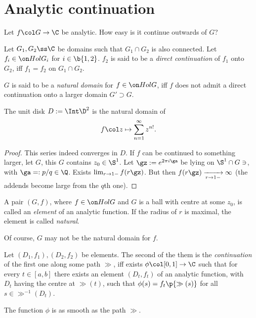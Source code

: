 \section{Analytic continuation}

Let $f \col G \to \C$ be analytic.
How easy is it continue outwards of $G$?

\begin{definition}
  Let $G_1, G_2 \ss \C$ be domains such that $G_1 \cap G_2$ is also connected.
  Let $f_i \in \Hol G_i$ for $i \in \b{1, 2}$.
  $f_2$ is said to be a \emph{direct continuation} of $f_1$ onto $G_2$, iff $f_1 = f_2$ on $G_1 \cap G_2$.
\end{definition}

\begin{definition}
  $G$ is said to be a \emph{natural domain} for $f \in \Hol G$, iff $f$ does not admit a direct continuation onto a larger domain $G' \supset G$.
\end{definition}

\begin{theorem}[Hadamard]
  The unit disk $D := \Int \D^2$ is the natural domain of
  $$ f \col z \mapsto \sum_{n=1}^\infty z^{n!}. $$
\end{theorem}

\begin{proof}
  This series indeed converges in $D$.
  If $f$ can be continued to something larger, let $G$, this $G$ contains $z_0 \in \S^1$.
  Let $\gz := e^{2 \pi i \ga}$ be lying on $\S^1 \cap G \ni$, with $\ga =: p/q \in \Q$.
  Exists $\lim_{r \to 1-} f(r \gz)$.
  But then $f(r\gz) \xrightarrow[r \to 1-]{} \infty$ (the addends become large from the $q$th one).
\end{proof}

\begin{definition}
  A pair $(G, f)$, where $f \in \Hol G$ and $G$ is a ball with centre at some $z_0$, is called an \emph{element} of an analytic function. If the radius of $r$ is maximal, the element is called \emph{natural}. 
\end{definition}

Of course, $G$ may not be the natural domain for $f$.

\begin{definition}
  Let $(D_1, f_1), (D_2, f_2)$ be elements.
  The second of the them is the \emph{continuation} of the first one along some path $\gg$, iff exists $\phi \col [0,1] \to \C$ such that for every $t \in [a,b]$ there exists an element $(D_t, f_t)$ of an analytic function, with $D_t$ having the centre at $\gg(t)$, such that $\phi(s) = f_t\p{\gg(s)}$ for all $s \in \gg^{-1}(D_t)$.
\end{definition}

The function $\phi$ is as smooth as the path $\gg$. 